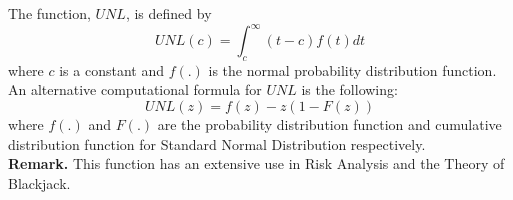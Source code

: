 \documentclass[12pt]{article}
\begin{document}
The \emph{} function, $UNL$, is defined by
$$UNL(c)=\int_{c}^{\infty}(t-c)f(t)dt$$
where $c$ is a constant and $f(.)$ is the normal probability distribution function.
\\An alternative computational formula for $UNL$ is the following:
$$UNL(z)=f(z)-z(1-F(z))$$
where $f(.)$ and $F(.)$ are the probability distribution function and cumulative distribution function 
for Standard Normal Distribution   respectively.
\\\textbf{Remark.}
This function has an extensive use in Risk Analysis and the Theory of Blackjack.
\end{document}
